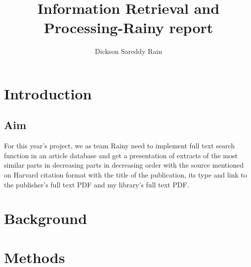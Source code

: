 \documentclass[a4paper,twocolumn,twoside]{article}
\begin{document}
 
	
	\title{Information Retrieval and Processing-Rainy report}
	\author{Dickson Sareddy Rain}  %
	\maketitle   
	
	\section{Introduction}
	\label{Introduction}
	\subsection{Aim}
	\label{aim}
	For this year's project, we as team Rainy need to implement full text search function in an article 
	database and get a presentation of extracts of the most similar parts in decreasing parts in decreasing 
	order with the source mentioned on Harvard citation format with the title of the publication, its type and 
	link to the publisher's full text PDF and my library's full text PDF. 		

	\section{Background}
	\label{Background}
	
	\section{Methods}
	\label{Methods}
\end{document}
